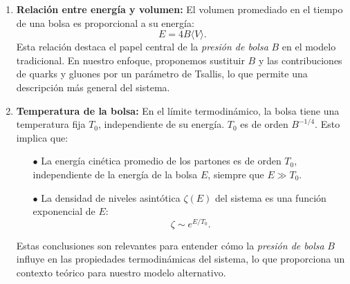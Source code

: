 \begin{enumerate}
    \item \textbf{Relación entre energía y volumen:} El volumen promediado en el tiempo de una bolsa es proporcional a su energía:
    \begin{equation}
        E = 4B \langle V \rangle.
    \end{equation}
    Esta relación destaca el papel central de la \emph{presión de bolsa} \( B \) en el modelo tradicional. En nuestro enfoque, proponemos sustituir \( B \) y las contribuciones de quarks y gluones por un parámetro de Tsallis, lo que permite una descripción más general del sistema.

    \item \textbf{Temperatura de la bolsa:} En el límite termodinámico, la bolsa tiene una temperatura fija \( T_0 \), independiente de su energía. \( T_0 \) es de orden \( B^{-1/4} \). Esto implica que:
    \begin{itemize}
        \item[$\bullet$] La energía cinética promedio de los partones es de orden \( T_0 \), independiente de la energía de la bolsa \( E \), siempre que \( E \gg T_0 \).
        \item[$\bullet$] La densidad de niveles asintótica \( \zeta(E) \) del sistema es una función exponencial de \( E \):
        \[
        \zeta \sim e^{E/T_0}.
        \]
    \end{itemize}
    Estas conclusiones son relevantes para entender cómo la \emph{presión de bolsa} \( B \) influye en las propiedades termodinámicas del sistema, lo que proporciona un contexto teórico para nuestro modelo alternativo.
\end{enumerate}





